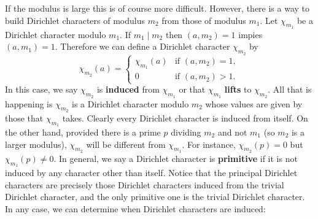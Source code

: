 \documentclass[12pt]{book}
\theoremstyle{definition}\newframedtheorem{method}{Method}
\newcommand{\<}{\langle}
\renewcommand{\>}{\rangle}
\begin{document}
    If the modulus is large this is of course more difficult. However, there is a way to build Dirichlet characters of modulus $m_{2}$ from those of modulus $m_{1}$. Let $\chi_{m_{1}}$ be a Dirichlet character modulo $m_{1}$. If $m_{1} \mid m_{2}$ then $(a,m_{2}) = 1$ impies $(a,m_{1}) = 1$. Therefore we can define a Dirichlet character $\chi_{m_{2}}$ by
    \[
      \chi_{m_{2}}(a) = \begin{cases} \chi_{m_{1}}(a) & \text{if $(a,m_{2}) = 1$}, \\ 0 & \text{if $(a,m_{2}) > 1$}. \end{cases}
    \]
    In this case, we say $\chi_{m_{2}}$ is \textbf{induced} from $\chi_{m_{1}}$ or that $\chi_{m_{1}}$ \textbf{lifts} to $\chi_{m_{2}}$. All that is happening is $\chi_{m_{2}}$ is a Dirichlet character modulo $m_{2}$ whose values are given by those that $\chi_{m_{1}}$ takes. Clearly every Dirichlet character is induced from itself. On the other hand, provided there is a prime $p$ dividing $m_{2}$ and not $m_{1}$ (so $m_{2}$ is a larger modulus), $\chi_{m_{2}}$ will be different from $\chi_{m_{1}}$. For instance, $\chi_{m_{2}}(p) = 0$ but $\chi_{m_{1}}(p) \neq 0$. In general, we say a Dirichlet character is \textbf{primitive} if it is not induced by any character other than itself. Notice that the principal Dirichlet characters are precisely those Dirichlet characters induced from the trivial Dirichlet character, and the only primitive one is the trivial Dirichlet character. In any case, we can determine when Dirichlet characters are induced:
\end{document}
